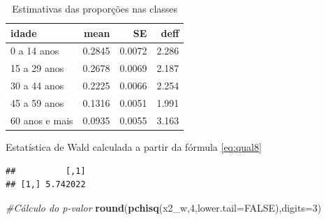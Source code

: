 \documentclass[]{book}
\newenvironment{Shaded}{\begin{snugshade}}{\end{snugshade}}
\newcommand{\KeywordTok}[1]{\textcolor[rgb]{0.13,0.29,0.53}{\textbf{{#1}}}}
\newcommand{\DataTypeTok}[1]{\textcolor[rgb]{0.13,0.29,0.53}{{#1}}}
\newcommand{\DecValTok}[1]{\textcolor[rgb]{0.00,0.00,0.81}{{#1}}}
\newcommand{\CommentTok}[1]{\textcolor[rgb]{0.56,0.35,0.01}{\textit{{#1}}}}
\newcommand{\OtherTok}[1]{\textcolor[rgb]{0.56,0.35,0.01}{{#1}}}
\newcommand{\NormalTok}[1]{{#1}}
\numberwithin{example}{chapter}
\numberwithin{remark}{chapter}
\numberwithin{definition}{chapter}
\begin{document}
\begin{table}

\caption{\label{tab:estpropclas}Estimativas das proporções nas classes}
\centering
\begin{tabular}[t]{lrrr}
\toprule
idade & mean & SE & deff\\
\midrule
0 a 14 anos & 0.2845 & 0.0072 & 2.286\\
15 a 29 anos & 0.2678 & 0.0069 & 2.187\\
30 a 44 anos & 0.2225 & 0.0066 & 2.254\\
45 a 59 anos & 0.1316 & 0.0051 & 1.991\\
60 anos e mais & 0.0935 & 0.0055 & 3.163\\
\bottomrule
\end{tabular}
\end{table}

Estatística de Wald calculada a partir da fórmula \eqref{eq:qual8}

\begin{Shaded}
\end{Shaded}

\begin{verbatim}
##          [,1]
## [1,] 5.742022
\end{verbatim}

\begin{Shaded}
\begin{Highlighting}[]
\CommentTok{#Cálculo do p-valor}
\KeywordTok{round}\NormalTok{(}\KeywordTok{pchisq}\NormalTok{(x2_w,}\DecValTok{4}\NormalTok{,}\DataTypeTok{lower.tail=}\OtherTok{FALSE}\NormalTok{),}\DataTypeTok{digits=}\DecValTok{3}\NormalTok{)}
\end{Highlighting}
\end{Shaded}
\end{document}
